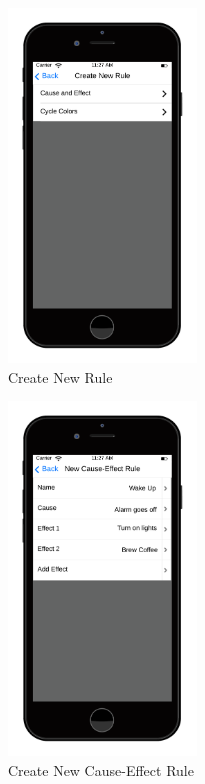 \documentclass[12pt]{article}
\begin{document}
  \begin{figure}[ht!]
    \centering
    \includegraphics[width=50mm]{Create_Rule.png}
    \caption{Create New Rule}
    \label{fig:newRule}
  \end{figure}
  
  \begin{figure}[ht!]
    \centering
    \includegraphics[width=50mm]{CauseEffect.png}
    \caption{Create New Cause-Effect Rule}
    \label{fig:newCauseEffectRule}
  \end{figure}
  
\end{document}
